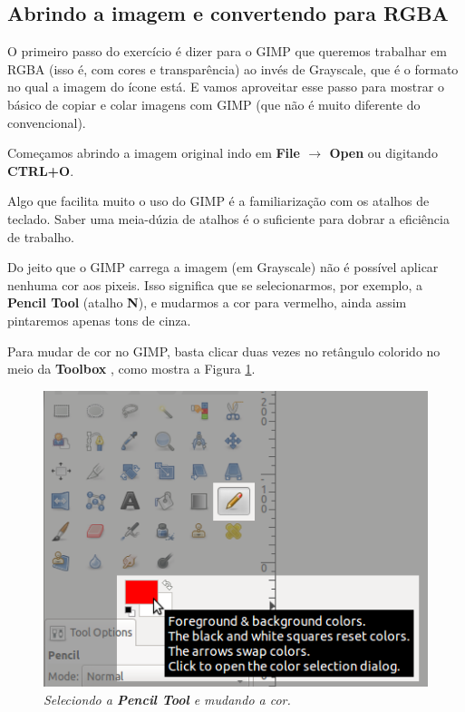 \documentclass[12pt,onecolumn]{article}
\begin{document}
  \subsection{Abrindo a imagem e convertendo para RGBA}
    O primeiro passo do exercício é dizer para o GIMP que queremos trabalhar em
    RGBA (isso é, com cores e transparência) ao invés de Grayscale, que é o
    formato no qual a imagem do ícone está. E vamos aproveitar esse passo para
    mostrar o básico de copiar e colar imagens com GIMP (que não é muito
    diferente do convencional).
    
    Começamos abrindo a imagem original indo em {\bf File $\rightarrow$ Open}
    ou digitando {\bf CTRL+O}.
    
    \begin{framed}
      Algo que facilita muito o uso do GIMP é a familiarização com os atalhos
      de teclado. Saber uma meia-dúzia de atalhos é o suficiente para dobrar a
      eficiência de trabalho. 
    \end{framed}
    
    Do jeito que o GIMP carrega a imagem (em Grayscale) não é possível aplicar
    nenhuma cor aos pixeis. Isso significa que se selecionarmos, por exemplo,
    a {\bf Pencil Tool} (atalho {\bf N}), e mudarmos a cor para vermelho, ainda
    assim pintaremos apenas tons de cinza.
    
    \begin{framed}
      Para mudar de cor no GIMP, basta clicar duas vezes no retângulo colorido
      no meio da {\bf Toolbox }, como mostra a Figura \ref{fig:pencil_and_color}.
    \end{framed}
    
    \begin{figure}[ht]
      \centering
      \includegraphics[width=.6\textwidth]{screenshots/00-pencil_and_color.png}
      \caption{
        \footnotesize
        \it
        Seleciondo a {\bf Pencil Tool} e mudando a cor.
      }
      \label{fig:pencil_and_color}
    \end{figure}
    
\end{document}
